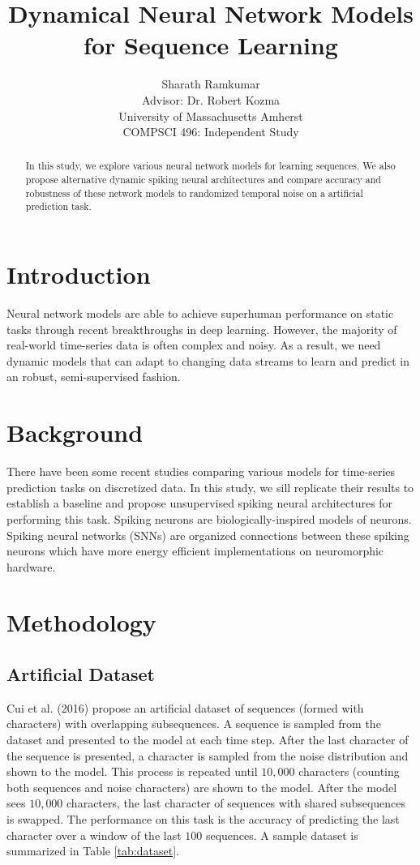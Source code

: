 \documentclass{article}
\title{Dynamical Neural Network Models\\for Sequence Learning}
\author{Sharath Ramkumar\\
Advisor: Dr. Robert Kozma\\University of Massachusetts Amherst\\COMPSCI 496: Independent Study}
\date{}
\begin{document}
\maketitle

\begin{abstract}
In this study, we explore various neural network models for learning sequences. We also propose alternative dynamic spiking neural architectures and compare accuracy and robustness of these network models to randomized temporal noise on a artificial prediction task.
\end{abstract}

\section*{Introduction}

Neural network models are able to achieve superhuman performance on static tasks through recent breakthroughs in deep learning. However, the majority of real-world time-series data is often complex and noisy. As a result, we need dynamic models that can adapt to changing data streams to learn and predict in an robust, semi-supervised fashion. 

\section*{Background}
There have been some recent studies comparing various models for time-series prediction tasks \cite{cui2016continuous} on discretized data. In this study, we sill replicate their results to establish a baseline and propose unsupervised spiking neural architectures for performing this task. Spiking neurons \cite{gerstner2002spiking} are biologically-inspired models of neurons. Spiking neural networks (SNNs) \cite{maass1997networks} are organized connections between these spiking neurons which have more energy efficient \cite{cruz2012energy} implementations on neuromorphic hardware.

\section*{Methodology}

\subsection*{Artificial Dataset}

Cui et al. (2016) propose an artificial dataset of sequences (formed with characters) with overlapping subsequences. A sequence is sampled from the dataset and presented to the model at each time step. After the last character of the sequence is presented, a character is sampled from the noise distribution and shown to the model. This process is repeated until $10,000$ characters (counting both sequences and noise characters) are shown to the model. After the model sees $10,000$ characters, the last character of sequences with shared subsequences is swapped. The performance on this task is the accuracy of predicting the last character over a window of the last $100$ sequences. A sample dataset is summarized in Table \ref{tab:dataset}.
\end{document}
